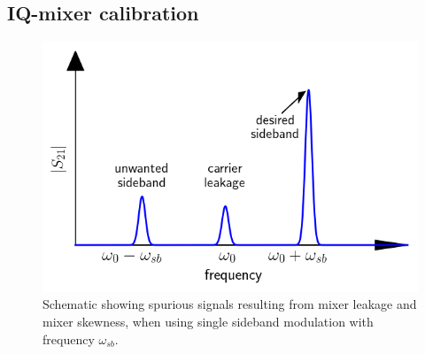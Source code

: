       \subsection{IQ-mixer calibration}
        \label{ssec:Mixer calibration}

        \begin{figure}[tb]
          \centering
          \includegraphics[width=.7\textwidth]{Figures/Calibration routines/Mixer leakage schematic.png}
          \caption{Schematic showing spurious signals resulting from mixer leakage and mixer skewness, when using single sideband modulation with frequency $\omega_{sb}$.}
          \label{fig:mixer imperfections schematic}
        \end{figure}

